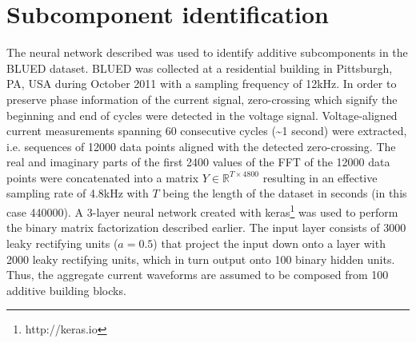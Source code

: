 \section{Subcomponent identification}
The neural network described was used to identify additive subcomponents in the BLUED \cite{anderson2012blued} dataset. BLUED was collected at a residential building in Pittsburgh, PA, USA during October 2011 with a sampling frequency of 12kHz. In order to preserve phase information of the current signal, zero-crossing which signify the beginning and end of cycles were detected in the voltage signal. Voltage-aligned current measurements spanning 60 consecutive cycles (\~{}1 second) were extracted, i.e. sequences of 12000 data points aligned with the detected zero-crossing. The real and imaginary parts of the first 2400 values of the FFT of the 12000 data points were concatenated into a matrix $Y \in \mathbb{R}^{T \times 4800}$ resulting in an effective sampling rate of 4.8kHz with $T$ being the length of the dataset in seconds (in this case 440000). A 3-layer neural network created with keras\footnote{http://keras.io} was used to perform the binary matrix factorization described earlier. The input layer consists of 3000 leaky rectifying units ($a = 0.5$) that project the input down onto a layer with 2000 leaky rectifying units, which in turn output onto 100 binary hidden units. Thus, the aggregate current waveforms are assumed to be composed from 100 additive building blocks.\\

